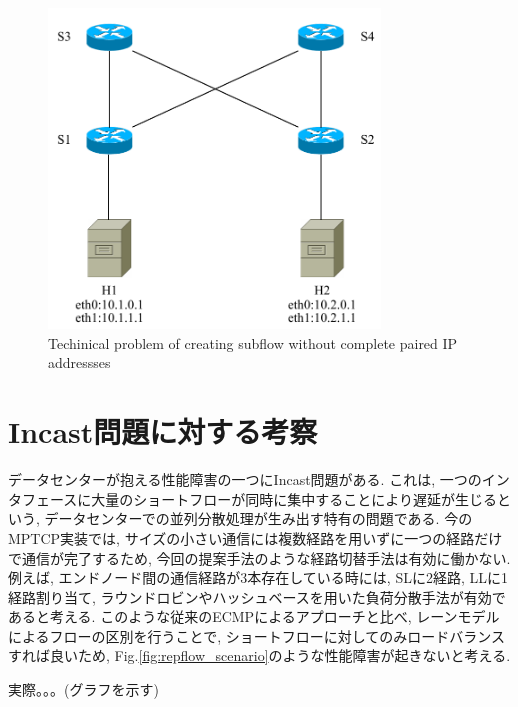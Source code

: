 \begin{figure}[t]
    \begin{center}
    \includegraphics[autoebb, width=250pt]{./img/pair_problem.pdf}
    \caption{Techinical problem of creating subflow without complete paired IP
    addressses}
    \label{fig:mptcp_pair}
    \end{center}
\end{figure}

\section{Incast問題に対する考察}
データセンターが抱える性能障害の一つにIncast問題がある. 
これは, 一つのインタフェースに大量のショートフローが同時に集中することにより遅延が生じるという, データセンターでの並列分散処理が生み出す特有の問題である. 
今のMPTCP実装では, サイズの小さい通信には複数経路を用いずに一つの経路だけで通信が完了するため, 今回の提案手法のような経路切替手法は有効に働かない. 
例えば, エンドノード間の通信経路が3本存在している時には, SLに2経路, LLに1経路割り当て,
ラウンドロビンやハッシュベースを用いた負荷分散手法が有効であると考える. 
このような従来のECMPによるアプローチと比べ, レーンモデルによるフローの区別を行うことで, ショートフローに対してのみロードバランスすれば良いため,
Fig.\ref{fig:repflow_scenario}のような性能障害が起きないと考える. 

実際。。。(グラフを示す)

